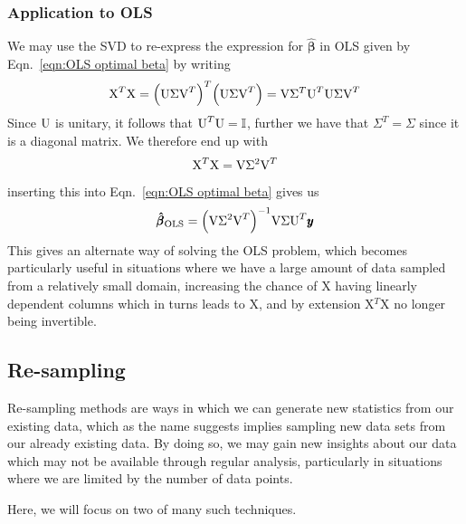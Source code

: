 \documentclass[reprint, english, nofootinbib]{revtex4-2}
\begin{document}
        \subsubsection{Application to OLS}
            We may use the SVD to re-express the expression for $\hat{\pmb \beta}$ in OLS given by Eqn.~\ref{eqn:OLS optimal beta}
            by writing
            \begin{equation}
                \textup{X}^T\textup{X} = \qty(\textup{U}\Sigma\textup{V}^T)^T\qty(\textup{U}\Sigma\textup{V}^T)
                = \textup{V}\Sigma^T\textup{U}^T\textup{U}\Sigma\textup{V}^T
            \end{equation}
            Since $\textup{U}$ is unitary, it follows that $\textup{U}^T\textup{U} = \mathbb I$, further we have that $\Sigma^T = \Sigma$ since it is a diagonal matrix. We therefore end up with
            \begin{equation}
                \textup{X}^T\textup{X} = \textup{V}\Sigma^2\textup{V}^T
            \end{equation}
            inserting this into Eqn.~\ref{eqn:OLS optimal beta} gives us
            \begin{equation}
                \pmb{\hat{\beta}}_{\textup{OLS}} = \qty(\textup{V}\Sigma^2\textup{V}^T)^{-1} \textup{V}\Sigma\textup{U}^T\pmb{y}
            \end{equation}
            This gives an alternate way of solving the OLS problem, which becomes particularly useful in situations where we have a large amount of data sampled from a relatively small domain, increasing the chance of X having linearly dependent columns which in turns leads to X, and by extension X$^T$X no longer being invertible.
    \subsection{Re-sampling}
        \noindent
        Re-sampling methods are ways in which we can generate new statistics from our existing data, which as the name suggests implies sampling new data sets from our already existing data. By doing so, we may gain new insights about our data which may not be available through regular analysis, particularly in situations where we are limited by the number of data points.

        Here, we will focus on two of many such techniques.
\end{document}
